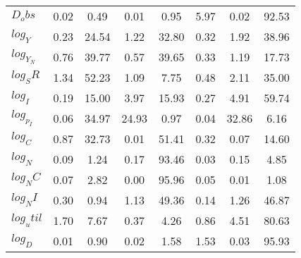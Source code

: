 \begin{center}
\begin{longtable}{lccccccc}
$D_obs     $	 & 	        0.02	 & 	        0.49	 & 	        0.01	 & 	        0.95	 & 	        5.97	 & 	        0.02	 & 	       92.53 \\ 
$log_Y     $	 & 	        0.23	 & 	       24.54	 & 	        1.22	 & 	       32.80	 & 	        0.32	 & 	        1.92	 & 	       38.96 \\ 
$log_Y_N   $	 & 	        0.76	 & 	       39.77	 & 	        0.57	 & 	       39.65	 & 	        0.33	 & 	        1.19	 & 	       17.73 \\ 
$log_SR    $	 & 	        1.34	 & 	       52.23	 & 	        1.09	 & 	        7.75	 & 	        0.48	 & 	        2.11	 & 	       35.00 \\ 
$log_I     $	 & 	        0.19	 & 	       15.00	 & 	        3.97	 & 	       15.93	 & 	        0.27	 & 	        4.91	 & 	       59.74 \\ 
$log_p_I   $	 & 	        0.06	 & 	       34.97	 & 	       24.93	 & 	        0.97	 & 	        0.04	 & 	       32.86	 & 	        6.16 \\ 
$log_C     $	 & 	        0.87	 & 	       32.73	 & 	        0.01	 & 	       51.41	 & 	        0.32	 & 	        0.07	 & 	       14.60 \\ 
$log_N     $	 & 	        0.09	 & 	        1.24	 & 	        0.17	 & 	       93.46	 & 	        0.03	 & 	        0.15	 & 	        4.85 \\ 
$log_NC    $	 & 	        0.07	 & 	        2.82	 & 	        0.00	 & 	       95.96	 & 	        0.05	 & 	        0.01	 & 	        1.08 \\ 
$log_NI    $	 & 	        0.30	 & 	        0.94	 & 	        1.13	 & 	       49.36	 & 	        0.14	 & 	        1.26	 & 	       46.87 \\ 
$log_util  $	 & 	        1.70	 & 	        7.67	 & 	        0.37	 & 	        4.26	 & 	        0.86	 & 	        4.51	 & 	       80.63 \\ 
$log_D     $	 & 	        0.01	 & 	        0.90	 & 	        0.02	 & 	        1.58	 & 	        1.53	 & 	        0.03	 & 	       95.93 \\ 
\end{longtable}
 \end{center}
